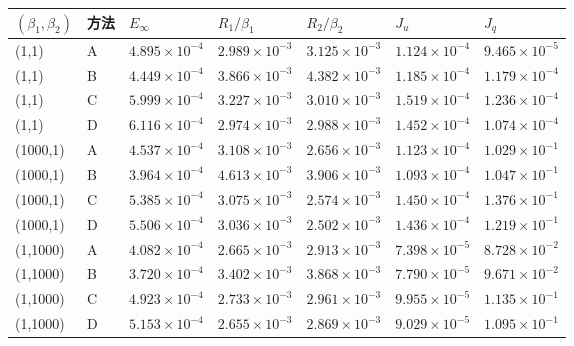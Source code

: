 \begin{tabular}{lllllll}\toprule
$(\beta_1,\beta_2)$ & 方法 & $E_\infty$ & $R_1/\beta_1$ & $R_2/\beta_2$ & $J_u$ & $J_q$ \\ \midrule
(1,1) & A & $4.895\times10^{-4}$ & $2.989\times10^{-3}$ & $3.125\times10^{-3}$ & $1.124\times10^{-4}$ & $9.465\times10^{-5}$ \\
(1,1) & B & $4.449\times10^{-4}$ & $3.866\times10^{-3}$ & $4.382\times10^{-3}$ & $1.185\times10^{-4}$ & $1.179\times10^{-4}$ \\
(1,1) & C & $5.999\times10^{-4}$ & $3.227\times10^{-3}$ & $3.010\times10^{-3}$ & $1.519\times10^{-4}$ & $1.236\times10^{-4}$ \\
(1,1) & D & $6.116\times10^{-4}$ & $2.974\times10^{-3}$ & $2.988\times10^{-3}$ & $1.452\times10^{-4}$ & $1.074\times10^{-4}$ \\
(1000,1) & A & $4.537\times10^{-4}$ & $3.108\times10^{-3}$ & $2.656\times10^{-3}$ & $1.123\times10^{-4}$ & $1.029\times10^{-1}$ \\
(1000,1) & B & $3.964\times10^{-4}$ & $4.613\times10^{-3}$ & $3.906\times10^{-3}$ & $1.093\times10^{-4}$ & $1.047\times10^{-1}$ \\
(1000,1) & C & $5.385\times10^{-4}$ & $3.075\times10^{-3}$ & $2.574\times10^{-3}$ & $1.450\times10^{-4}$ & $1.376\times10^{-1}$ \\
(1000,1) & D & $5.506\times10^{-4}$ & $3.036\times10^{-3}$ & $2.502\times10^{-3}$ & $1.436\times10^{-4}$ & $1.219\times10^{-1}$ \\
(1,1000) & A & $4.082\times10^{-4}$ & $2.665\times10^{-3}$ & $2.913\times10^{-3}$ & $7.398\times10^{-5}$ & $8.728\times10^{-2}$ \\
(1,1000) & B & $3.720\times10^{-4}$ & $3.402\times10^{-3}$ & $3.868\times10^{-3}$ & $7.790\times10^{-5}$ & $9.671\times10^{-2}$ \\
(1,1000) & C & $4.923\times10^{-4}$ & $2.733\times10^{-3}$ & $2.961\times10^{-3}$ & $9.955\times10^{-5}$ & $1.135\times10^{-1}$ \\
(1,1000) & D & $5.153\times10^{-4}$ & $2.655\times10^{-3}$ & $2.869\times10^{-3}$ & $9.029\times10^{-5}$ & $1.095\times10^{-1}$ \\
\bottomrule\end{tabular}
